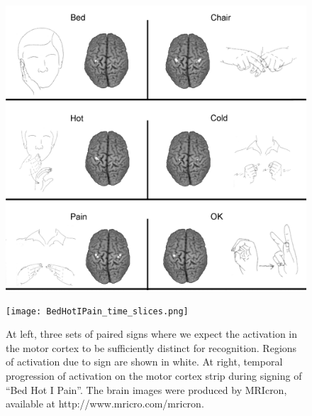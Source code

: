 \documentclass{proposal}
\begin{document}
\begin{figure}[h]
\begin{minipage}[t]{120mm}
\begin{center}
\includegraphics[width=120mm,clip]{all_vs.png}
\end{center}
\end{minipage}
\hfill
\begin{minipage}[t]{35mm}
\begin{center}
\texttt{[image: BedHotIPain\_time\_slices.png]}
\end{center}
\end{minipage}
\caption{\label{fig:brainsign} At left, three sets of paired signs where we expect the activation in the motor cortex to be sufficiently distinct for recognition. Regions of activation due to sign are shown in white. At right, temporal progression of activation on the motor cortex strip during signing of ``Bed Hot I Pain''. The brain images were produced by MRIcron, available at http://www.mricro.com/mricron.}
\end{figure}
\end{document}
